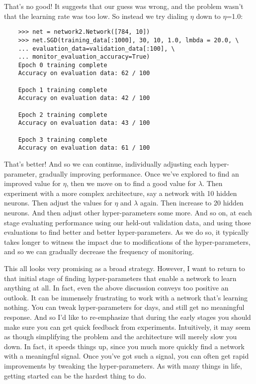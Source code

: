 That's no good! It suggests that our guess was wrong, and the problem wasn't that the learning rate was too low. So instead we try dialing $\eta$ down to $\eta$=1.0:


\begin{lstlisting}
    >>> net = network2.Network([784, 10])
    >>> net.SGD(training_data[:1000], 30, 10, 1.0, lmbda = 20.0, \
    ... evaluation_data=validation_data[:100], \
    ... monitor_evaluation_accuracy=True)
    Epoch 0 training complete
    Accuracy on evaluation data: 62 / 100
    
    Epoch 1 training complete
    Accuracy on evaluation data: 42 / 100
    
    Epoch 2 training complete
    Accuracy on evaluation data: 43 / 100
    
    Epoch 3 training complete
    Accuracy on evaluation data: 61 / 100
\end{lstlisting}

That's better! And so we can continue, individually adjusting each hyper-parameter, gradually improving performance. Once we've explored to find an improved value for $\eta$, then we move on to find a good value for $\lambda$. Then experiment with a more complex architecture, say a network with 10 hidden neurons. Then adjust the values for $\eta$ and $\lambda$ again. Then increase to 20 hidden neurons. And then adjust other hyper-parameters some more. And so on, at each stage evaluating performance using our held-out validation data, and using those evaluations to find better and better hyper-parameters. As we do so, it typically takes longer to witness the impact due to modifications of the hyper-parameters, and so we can gradually decrease the frequency of monitoring.

This all looks very promising as a broad strategy. However, I want to return to that initial stage of finding hyper-parameters that enable a network to learn anything at all. In fact, even the above discussion conveys too positive an outlook. It can be immensely frustrating to work with a network that's learning nothing. You can tweak hyper-parameters for days, and still get no meaningful response. And so I'd like to re-emphasize that during the early stages you should make sure you can get quick feedback from experiments. Intuitively, it may seem as though simplifying the problem and the architecture will merely slow you down. In fact, it speeds things up, since you much more quickly find a network with a meaningful signal. Once you've got such a signal, you can often get rapid improvements by tweaking the hyper-parameters. As with many things in life, getting started can be the hardest thing to do.

